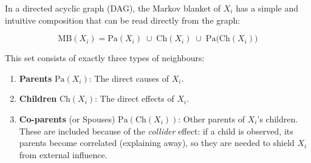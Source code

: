 In a directed acyclic graph (DAG), the Markov blanket of \(X_i\) has a simple and intuitive composition that can be read directly from the graph:

\[
\boxed{
\mathrm{MB}(X_i) = \mathrm{Pa}(X_i) \;\cup\; \mathrm{Ch}(X_i) \;\cup\; \mathrm{Pa}\bigl(\mathrm{Ch}(X_i)\bigr)
}
\]

This set consists of exactly three types of neighbours:
\begin{enumerate}
    \item \textbf{Parents} \(\mathrm{Pa}(X_i)\): The direct causes of \(X_i\).
    \item \textbf{Children} \(\mathrm{Ch}(X_i)\): The direct effects of \(X_i\).
    \item \textbf{Co-parents} (or Spouses) \(\mathrm{Pa}(\mathrm{Ch}(X_i))\): Other parents of \(X_i\)'s children. These are included because of the \emph{collider} effect: if a child is observed, its parents become correlated (explaining away), so they are needed to shield \(X_i\) from external influence.
\end{enumerate}

